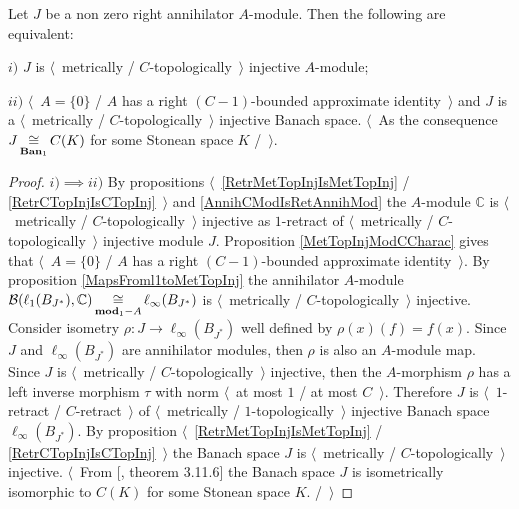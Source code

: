 \begin{proposition}\label{MetTopInjOfAnnihModCharac} Let $J$ be a non zero right annihilator $A$-module. Then the following are equivalent:

$i)$ $J$ is $\langle$~metrically / $C$-topologically~$\rangle$ injective $A$-module;

$ii)$ $\langle$~$A=\{0\}$ / $A$ has a right $(C-1)$-bounded approximate identity~$\rangle$ and $J$ is a $\langle$~metrically / $C$-topologically~$\rangle$ injective Banach space. $\langle$~As the consequence $J\mathop{\mathbin{\cong}}\limits_{\mathbf{Ban}_1}C(K)$ for some Stonean space $K$ /~$\rangle$.
\end{proposition}
\begin{proof} $i)$$\implies$$ ii)$  By propositions $\langle$~\ref{RetrMetTopInjIsMetTopInj} / \ref{RetrCTopInjIsCTopInj}~$\rangle$ and \ref{AnnihCModIsRetAnnihMod} the $A$-module $\mathbb{C}$ is $\langle$~metrically / $C$-topologically~$\rangle$ injective as $1$-retract of $\langle$~metrically / $C$-topologically~$\rangle$ injective module $J$. Proposition \ref{MetTopInjModCCharac} gives that $\langle$~$A=\{0\}$ / $A$ has a right $(C-1)$-bounded approximate identity~$\rangle$. By proposition \ref{MapsFroml1toMetTopInj} the annihilator $A$-module $\mathcal{B}(\ell_1(B_{J^*}),\mathbb{C})\mathop{\mathbin{\cong}}\limits_{\mathbf{mod}_1-A}\ell_\infty(B_{J^*})$ is $\langle$~metrically / $C$-topologically~$\rangle$ injective. Consider isometry $\rho:J\to\ell_\infty(B_{J^*})$ well defined by $\rho(x)(f)=f(x)$. Since $J$ and $\ell_\infty(B_{J^*})$ are annihilator modules, then $\rho$ is also an $A$-module map. Since $J$ is $\langle$~metrically / $C$-topologically~$\rangle$ injective, then the $A$-morphism $\rho$ has a left inverse morphism $\tau$ with norm $\langle$~at most $1$ / at most $C$~$\rangle$. Therefore $J$ is $\langle$~$1$-retract / $C$-retract~$\rangle$ of $\langle$~metrically / $1$-topologically~$\rangle$ injective Banach space $\ell_\infty(B_{J^*})$. By proposition $\langle$~\ref{RetrMetTopInjIsMetTopInj} / \ref{RetrCTopInjIsCTopInj}~$\rangle$ the Banach space $J$ is $\langle$~metrically / $C$-topologically~$\rangle$ injective. $\langle$~From  [\cite{LaceyIsomThOfClassicBanSp}, theorem 3.11.6] the Banach space $J$ is isometrically isomorphic to $C(K)$ for some Stonean space $K$. /~$\rangle$ 


\end{proof}
